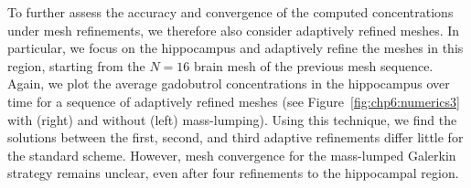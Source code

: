 To further assess the accuracy and convergence of the computed
concentrations under mesh refinements, we therefore also consider
adaptively refined meshes. In particular, we focus on the hippocampus
and adaptively refine the meshes in this region, starting from the
$N=16$ brain mesh of the previous mesh sequence. Again, we plot the
average gadobutrol concentrations in the hippocampus over time for
a sequence of adaptively refined meshes (see
Figure~\ref{fig:chp6:numerics3} with (right) and without (left)
mass-lumping). Using this technique, we find the solutions between the first, second,
and third adaptive refinements differ little for the standard
scheme. However, mesh convergence for the mass-lumped Galerkin
strategy remains unclear, even after four refinements to the
hippocampal region.  

